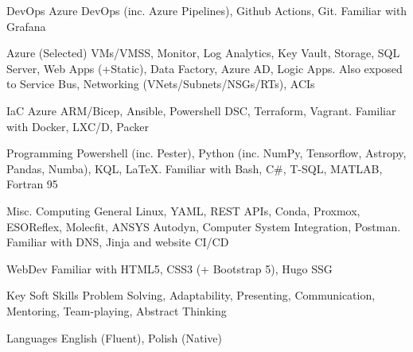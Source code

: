 

\begin{cvskills}

  \cvskill
    {DevOps} 
    {Azure DevOps (inc. Azure Pipelines), Github Actions, Git. Familiar with Grafana} 

  \cvskill
    {Azure (Selected)} 
    {VMs/VMSS, Monitor, Log Analytics, Key Vault, Storage, SQL Server, Web Apps (+Static), Data Factory, Azure AD, Logic Apps. Also exposed to Service Bus, Networking (VNets/Subnets/NSGs/RTs), ACIs}

  \cvskill
    {IaC} 
    {Azure ARM/Bicep, Ansible, Powershell DSC, Terraform, Vagrant. Familiar with Docker, LXC/D, Packer} 

  \cvskill
    {Programming} 
    {Powershell (inc. Pester), Python (inc. NumPy, Tensorflow, Astropy, Pandas, Numba), KQL, \LaTeX. Familiar with Bash, C\#, T-SQL, MATLAB, Fortran 95} 
    
  \cvskill
    {Misc. Computing} 
    {General Linux, YAML, REST APIs, Conda, Proxmox, ESOReflex, Molecfit, ANSYS Autodyn, Computer System Integration, Postman. Familiar with DNS, Jinja and website CI/CD} 

  \cvskill
    {WebDev} 
    {Familiar with HTML5, CSS3 (+ Bootstrap 5), Hugo SSG} 

  \cvskill
    {Key Soft Skills} 
    {Problem Solving, Adaptability, Presenting, Communication, Mentoring, Team-playing, Abstract Thinking} 

  \cvskill
    {Languages} 
    {English (Fluent), Polish (Native)} 
    
\end{cvskills}
